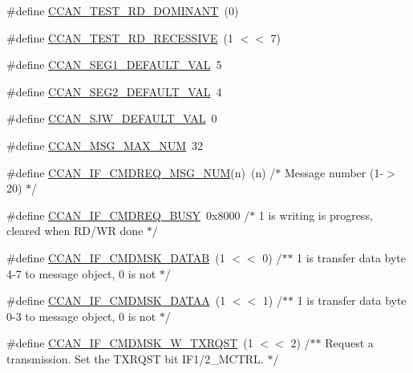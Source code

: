 \begin{DoxyCompactItemize}
\item 
\#define \hyperlink{group___c_c_a_n__18_x_x__43_x_x_ga26893920c44fae47b780aadb6f60f793}{C\+C\+A\+N\+\_\+\+T\+E\+S\+T\+\_\+\+R\+D\+\_\+\+D\+O\+M\+I\+N\+A\+NT}~(0)
\item 
\#define \hyperlink{group___c_c_a_n__18_x_x__43_x_x_gae528570ba4469a074747eb03f90f246a}{C\+C\+A\+N\+\_\+\+T\+E\+S\+T\+\_\+\+R\+D\+\_\+\+R\+E\+C\+E\+S\+S\+I\+VE}~(1 $<$$<$ 7)
\item 
\#define \hyperlink{group___c_c_a_n__18_x_x__43_x_x_ga33b5235b82cb4fbf0d9741a8b30fff3e}{C\+C\+A\+N\+\_\+\+S\+E\+G1\+\_\+\+D\+E\+F\+A\+U\+L\+T\+\_\+\+V\+AL}~5
\item 
\#define \hyperlink{group___c_c_a_n__18_x_x__43_x_x_ga74a3eea2e682a68876147a57d5c39698}{C\+C\+A\+N\+\_\+\+S\+E\+G2\+\_\+\+D\+E\+F\+A\+U\+L\+T\+\_\+\+V\+AL}~4
\item 
\#define \hyperlink{group___c_c_a_n__18_x_x__43_x_x_ga8c1b9b8c1870fc3056da0debea8a4c49}{C\+C\+A\+N\+\_\+\+S\+J\+W\+\_\+\+D\+E\+F\+A\+U\+L\+T\+\_\+\+V\+AL}~0
\item 
\#define \hyperlink{group___c_c_a_n__18_x_x__43_x_x_ga1b19a6ba9e51a4c56063942efb73bcb0}{C\+C\+A\+N\+\_\+\+M\+S\+G\+\_\+\+M\+A\+X\+\_\+\+N\+UM}~32
\item 
\#define \hyperlink{group___c_c_a_n__18_x_x__43_x_x_gafd89f40b1906826e3e6be2fa6158a15e}{C\+C\+A\+N\+\_\+\+I\+F\+\_\+\+C\+M\+D\+R\+E\+Q\+\_\+\+M\+S\+G\+\_\+\+N\+UM}(n)~(n)			/$\ast$ Message number (1-\/$>$20) $\ast$/
\item 
\#define \hyperlink{group___c_c_a_n__18_x_x__43_x_x_ga18ef1013a0028ca27030b764c755a483}{C\+C\+A\+N\+\_\+\+I\+F\+\_\+\+C\+M\+D\+R\+E\+Q\+\_\+\+B\+U\+SY}~0x8000			/$\ast$ 1 is writing is progress, cleared when R\+D/\+W\+R done $\ast$/
\item 
\#define \hyperlink{group___c_c_a_n__18_x_x__43_x_x_ga51b44e8b4e1dc3c1701fb6b352ce200a}{C\+C\+A\+N\+\_\+\+I\+F\+\_\+\+C\+M\+D\+M\+S\+K\+\_\+\+D\+A\+T\+AB}~(1 $<$$<$ 0)		/$\ast$$\ast$ 1 is transfer data byte 4-\/7 to message object, 0 is not $\ast$/
\item 
\#define \hyperlink{group___c_c_a_n__18_x_x__43_x_x_ga6c0cbbac4aa6768663bde8a577bba92a}{C\+C\+A\+N\+\_\+\+I\+F\+\_\+\+C\+M\+D\+M\+S\+K\+\_\+\+D\+A\+T\+AA}~(1 $<$$<$ 1)		/$\ast$$\ast$ 1 is transfer data byte 0-\/3 to message object, 0 is not $\ast$/
\item 
\#define \hyperlink{group___c_c_a_n__18_x_x__43_x_x_gace17a9473722068a46e84170e18232c1}{C\+C\+A\+N\+\_\+\+I\+F\+\_\+\+C\+M\+D\+M\+S\+K\+\_\+\+W\+\_\+\+T\+X\+R\+Q\+ST}~(1 $<$$<$ 2)		/$\ast$$\ast$ Request a transmission. Set the T\+X\+R\+Q\+ST bit I\+F1/2\+\_\+\+M\+C\+T\+R\+L. $\ast$/
$$
\end{DoxyCompactItemize}
